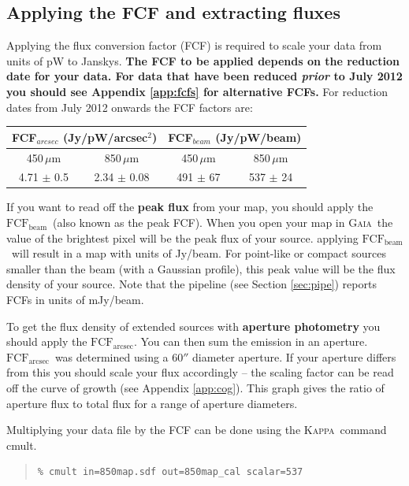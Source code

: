 \documentclass[twoside,11pt]{article}
\newcommand{\xref}[3]{#1}
\newcommand{\xlabel}[1]{}
\renewcommand{\_}{\texttt{\symbol{95}}}
\newenvironment{myquote}{\begin{quote}\begin{small}}{\end{small}\end{quote}}
\newcommand{\fcfb}{$\mathrm{FCF_{beam}}$}
\newcommand{\fcfa}{$\mathrm{FCF_{arcsec}}$}
\newcommand{\gaia}{\xref{\textsc{Gaia}}{sun214}{}}
\newcommand{\Kappa}{\xref{\textsc{Kappa}}{sun95}{}}
\newcommand{\task}[1]{\textsf{#1}}
\newcommand{\cmult}{\xref{\task{cmult}}{sun95}{CMULT}}
\begin{document}
\subsection{\xlabel{apply_fcf}Applying the FCF and extracting fluxes}
\label{sec:cmult}
Applying the flux conversion factor (FCF) is required to scale your data from units of pW to Janskys. \textbf{The FCF to be applied depends on the reduction date for your data. For data that have been reduced \emph{prior} to July 2012 you should see Appendix \ref{app:fcfs} for alternative FCFs.} For reduction dates from July 2012 onwards the FCF factors are:
\begin{table}[h!]
\centering
\begin{tabular}{|c|c|c|c|}
 \hline
 \multicolumn{2}{|c|}{FCF$_{arcsec}$ (Jy/pW/arcsec$^2$) }  & 
\multicolumn{2}{c|}{FCF$_{beam}$ (Jy/pW/beam)}      \\
\hline
\hspace{0.4cm} 450\,$\mu$m \hspace{0.3cm} & 850\,$\mu$m & \hspace{0.4cm} 450\,$\mu$m \hspace{0.3cm}& 850\,$\mu$m \\
 \hline
4.71 $\pm$ 0.5& 2.34 $\pm$ 0.08& 491 $\pm$ 67& 537 $\pm$ 24 \\
\hline
\end{tabular}
\end{table}

If you want to read off the \textbf{peak flux} from your map, you should apply the \fcfb\ (also known as the peak FCF). When you open your map in \gaia\ the value of the brightest pixel will be the peak flux of your source. applying \fcfb\ will result in a map with units of Jy/beam. For point-like or compact sources smaller than the beam (with a Gaussian profile), this peak value will be the flux density of your source. Note that the pipeline (see Section \ref{sec:pipe}) reports FCFs in units of mJy/beam.

To get the flux density of extended sources with \textbf{aperture photometry} you should apply the \fcfa.  You can then sum the emission in an aperture. \fcfa\ was determined using a 60$''$ diameter aperture. If your aperture differs from this you should scale your flux accordingly -- the scaling factor can be read off the curve of growth (see Appendix \ref{app:cog}). This graph gives the ratio of aperture flux to total flux for a range of aperture diameters.

Multiplying your data file by the FCF can be done using the \Kappa\ command \cmult.
\begin{myquote}
\begin{verbatim}
% cmult in=850map.sdf out=850map_cal scalar=537
\end{verbatim}
\end{myquote}
\end{document}
